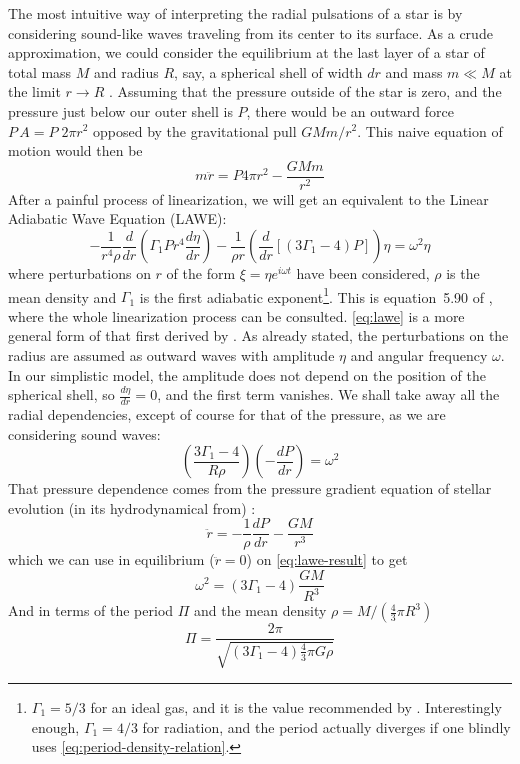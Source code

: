 	The most intuitive way of interpreting the radial pulsations of a star 
	is by considering sound-like waves traveling from its center to its surface.
	As a crude approximation, we could consider the equilibrium at the last layer of a star of total mass $M$ and  radius $R$,
	say, a spherical shell of width $dr$ and mass $m\ll M$ at the limit $r\to R$ . 
	Assuming that the pressure outside of the star is zero, and the pressure just below our outer shell is $P$,
	there would be an outward force $P\,A=P\;2\pi r^2$ opposed by the gravitational pull $GMm/r^2$.
	This naive equation of motion would then be
	\begin{equation}
		m \ddot{r} = P 4\pi r^2 - \frac{GMm}{r^2} \label{eq:period-density-motion}
	\end{equation}
	After a painful process of linearization, we will get an equivalent to the Linear Adiabatic Wave Equation (LAWE):
	\begin{equation}
		-\frac{1}{r^4 \rho} \frac{d}{dr}\left(\Gamma_1P r^4 \frac{d\eta}{dr}\right) - \frac{1}{\rho r}\left(\frac{d}{dr}\left[\left(3\Gamma_1-4\right)P\right]\right)\eta = \omega^2 \eta \label{eq:lawe}
	\end{equation}
	where perturbations on $r$ of the form $\xi = \eta e^{i\omega t}$ have been considered, $\rho$ is the mean density and $\Gamma_1$ is the first adiabatic exponent\footnote{
		$\Gamma_1=5/3$ for an ideal gas, and it is the value recommended by \cite{Cox1980}. 
		Interestingly enough, $\Gamma_1=4/3$ for radiation, and the period actually diverges if one blindly uses \autoref{eq:period-density-relation}.
	}. This is equation~5.90 of \cite{Catelan2015}, where the whole linearization process can be consulted.
	\autoref{eq:lawe} is a more general form of that first derived by \cite{Eddington1918}.
	As already stated, the perturbations on the radius are assumed as outward waves with amplitude $\eta$ and angular frequency $\omega$.
	In our simplistic model, the amplitude does not depend on the position of the spherical shell, so $\frac{d\eta}{dr}=0$, and the first term vanishes.
	We shall take away all the radial dependencies, except of course for that of the pressure, as we are considering sound waves:
	\begin{equation}
		\left(\frac{3 \Gamma_1-4}{R\rho}\right)\left(-\frac{dP}{dr}\right) = \omega^2 \label{eq:lawe-result}
	\end{equation}
	That pressure dependence comes from the pressure gradient equation of stellar evolution (in its hydrodynamical from) \cite[equation 4.18]{Catelan2015}:
	\begin{equation}
		\ddot{r} = -\frac{1}{\rho} \frac{d P}{d r}-\frac{GM}{r^3}
	\end{equation}
	which we can use in equilibrium ($\ddot{r}=0$) on \autoref{eq:lawe-result} to get
	$$
	\omega^2 = (3\Gamma_1-4)\frac{GM}{R^3}
	$$
	And in terms of the period $\Pi$ and the mean density $\rho=M/(\frac{4}{3}\pi R^3)$
	\begin{equation}
		\Pi = \frac{2\pi}{\sqrt{(3\Gamma_1-4)\frac{4}{3}\pi G \rho}} \label{eq:period-density-relation}
	\end{equation}
	
